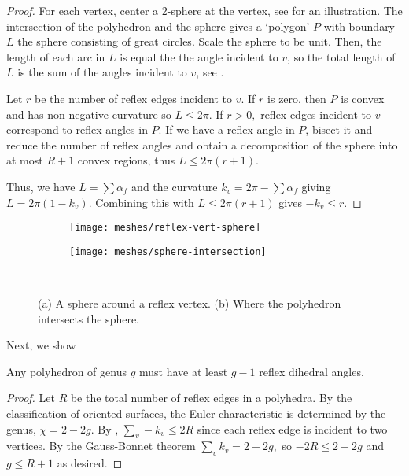 \begin{proof}

For each vertex, center a 2-sphere at the vertex,
see  \label{fig:sphere-on-vert} for an illustration.
The intersection of the polyhedron and the sphere
gives a `polygon' $P$ with boundary $L$ the sphere consisting of great
circles. 
Scale the sphere to be unit. Then, the length of each arc
in $L$ is equal the the angle incident to $v$, so the total length of $L$ is
the sum of the angles incident to $v$, see .

Let $r$ be the number of reflex edges incident to $v$.
If $r$ is zero, then $P$ is convex and has non-negative curvature
so $L\leq 2\pi$. If $r>0,$
reflex edges incident to $v$ correspond to reflex angles in $P$.
If we have a reflex angle in $P$, bisect it and reduce the 
number of reflex angles and obtain a decomposition
of the sphere into at most $R+1$ convex regions,
thus $L\leq 2\pi(r+1)$.

Thus, we have $L=\sum \alpha_f$ and the curvature 
$k_v=2\pi-\sum \alpha_f$ giving
$L=2\pi(1-k_v)$. Combining this with $L\leq 2\pi(r+1)$
gives $-k_v\leq r.$


\end{proof}

\begin{figure}[htb]
        \centering
        \begin{subfigure}[b]{0.35\textwidth}
        \texttt{[image: meshes/reflex-vert-sphere]}
        \caption{}
          \label{fig:sphere-on-vert}
        \end{subfigure}
          \hspace{.0cm}
         \begin{subfigure}[b]{0.45\textwidth}
        \texttt{[image: meshes/sphere-intersection]}
        \caption{}
        \label{fig:sphere}
        \end{subfigure}\\
		\caption{(a) A sphere around a reflex vertex. (b) Where the polyhedron
		intersects the sphere.
		\label{fig:sphere}}
\end{figure}


Next, we show
\begin{theorem}\label{thm:reflex}

Any polyhedron of genus $g$ must have 
at least $g-1$ reflex dihedral angles. 

\end{theorem}
\begin{proof}
Let $R$ be the total number of reflex edges in a polyhedra.
By the classification of oriented surfaces, the Euler characteristic 
 is determined by the genus, $\chi=2-2g$.
By , $\sum_v -k_v\leq 2 R$ since each
reflex edge is incident to two vertices.
By the Gauss-Bonnet theorem $\sum_vk_v= 2-2g,$
so $-2R\leq 2-2g$ and $g\leq R+1$ as desired.

\end{proof}


